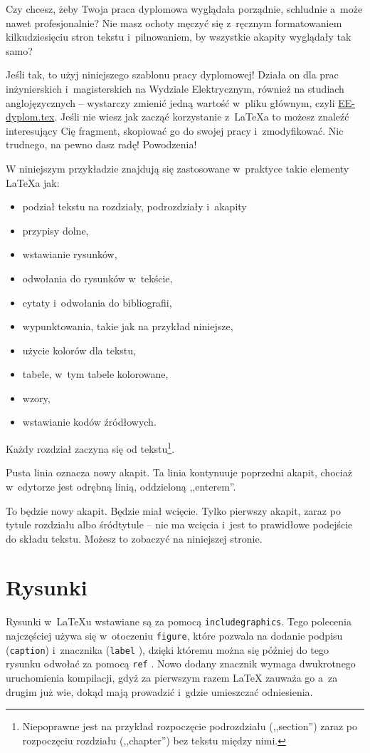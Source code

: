 Czy chcesz, żeby Twoja praca dyplomowa wyglądała porządnie, schludnie a~może nawet profesjonalnie? Nie masz ochoty
męczyć się z~ręcznym formatowaniem kilkudziesięciu stron tekstu i~pilnowaniem, by wszystkie akapity wyglądały tak samo?

Jeśli tak, to użyj niniejszego szablonu pracy dyplomowej! Działa on dla prac inżynierskich i~magisterskich na Wydziale
Elektrycznym, również na studiach anglojęzycznych -- wystarczy zmienić jedną wartość w~pliku głównym, czyli
\href{./EE-dyplom.tex}{EE-dyplom.tex}. Jeśli nie wiesz jak zacząć korzystanie z~\LaTeX{a}
to możesz znaleźć interesujący Cię fragment, skopiować go do swojej pracy i~zmodyfikować. Nic trudnego, na pewno dasz
radę! Powodzenia!

W niniejszym przykładzie znajdują się zastosowane w~praktyce takie elementy \LaTeX{a} jak:
\begin{itemize}
    \item podział tekstu na rozdziały, podrozdziały i~akapity
    \item przypisy dolne,
    \item wstawianie rysunków,
    \item odwołania do rysunków w~tekście,
    \item cytaty i~odwołania do bibliografii,
    \item wypunktowania, takie jak na przykład niniejsze,
    \item użycie kolorów dla tekstu,
    \item tabele, w~tym tabele kolorowane, %
    \item wzory, %
    \item wstawianie kodów źródłowych.
\end{itemize}

Każdy rozdział zaczyna się od tekstu\footnote
{Niepoprawne jest na przykład rozpoczęcie podrozdziału (,,section'') zaraz po rozpoczęciu rozdziału (,,chapter'')
    bez tekstu między nimi.}.

Pusta linia oznacza nowy akapit.
Ta linia kontynuuje poprzedni akapit, chociaż w~edytorze jest odrębną linią, oddzieloną ,,enterem''.

To będzie nowy akapit. Będzie miał wcięcie. Tylko pierwszy akapit, zaraz po tytule rozdziału albo śródtytule -- nie ma
wcięcia i~jest to prawidłowe podejście do składu tekstu. Możesz to zobaczyć na niniejszej stronie.



\section{Rysunki}
Rysunki w~\LaTeX{u} wstawiane są za pomocą \texttt{includegraphics}. Tego polecenia najczęściej używa się w~otoczeniu
\texttt{figure}, które pozwala na dodanie podpisu (\texttt{caption}) i~znacznika (\texttt{label}
), dzięki któremu można się później do tego rysunku odwołać za pomocą \texttt{ref}
. Nowo dodany znacznik wymaga dwukrotnego uruchomienia kompilacji, gdyż za pierwszym razem \LaTeX{}
zauważa go a~za drugim już wie, dokąd mają prowadzić i~gdzie umieszczać odniesienia.


